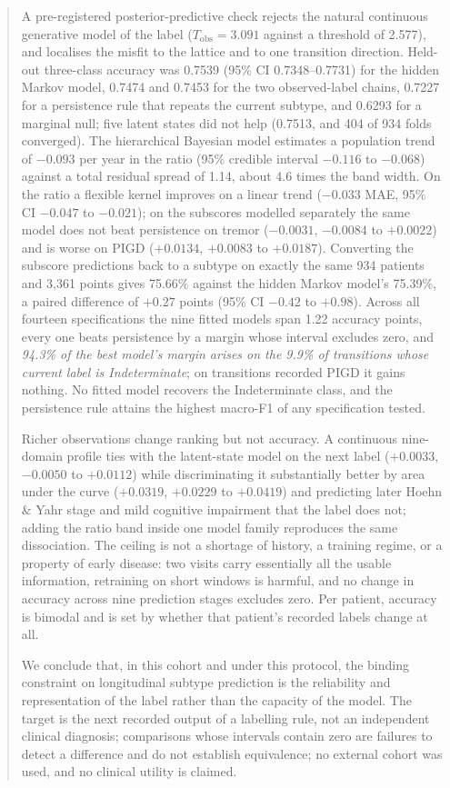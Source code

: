 \documentclass[11pt]{article}
\begin{document}
\begin{abstract}
A pre-registered posterior-predictive check rejects the natural continuous
generative model of the label ($T_{\mathrm{obs}} = 3.091$ against a threshold of
2.577), and localises the misfit to the lattice and to one transition
direction. Held-out three-class accuracy was 0.7539 (95\% CI 0.7348--0.7731) for
the hidden Markov model, 0.7474 and 0.7453 for the two observed-label chains,
0.7227 for a persistence rule that repeats the current subtype, and 0.6293 for
a marginal null; five latent states did not help (0.7513, and 404 of 934 folds
converged). The hierarchical Bayesian model estimates a population trend of
$-0.093$ per year in the ratio (95\% credible interval $-0.116$ to $-0.068$)
against a total residual spread of 1.14, about 4.6 times the band width. On the
ratio a flexible kernel improves on a linear trend ($-0.033$ MAE, 95\% CI
$-0.047$ to $-0.021$); on the subscores modelled separately the same model does
not beat persistence on tremor ($-0.0031$, $-0.0084$ to $+0.0022$) and is worse
on PIGD ($+0.0134$, $+0.0083$ to $+0.0187$). Converting the subscore
predictions back to a subtype on exactly the same 934 patients and 3,361 points
gives 75.66\% against the hidden Markov model's 75.39\%, a paired difference of
$+0.27$ points (95\% CI $-0.42$ to $+0.98$). Across all fourteen specifications
the nine fitted models span 1.22 accuracy points, every one beats persistence by
a margin whose interval excludes zero, and \emph{94.3\% of the best model's
margin arises on the 9.9\% of transitions whose current label is Indeterminate};
on transitions recorded PIGD it gains nothing. No fitted model recovers the
Indeterminate class, and the persistence rule attains the highest macro-F1 of
any specification tested.

Richer observations change ranking but not accuracy. A continuous nine-domain
profile ties with the latent-state model on the next label ($+0.0033$, $-0.0050$
to $+0.0112$) while discriminating it substantially better by area under the
curve ($+0.0319$, $+0.0229$ to $+0.0419$) and predicting later Hoehn \& Yahr
stage and mild cognitive impairment that the label does not; adding the ratio
band inside one model family reproduces the same dissociation. The ceiling is
not a shortage of history, a training regime, or a property of early disease: two
visits carry essentially all the usable information, retraining on short windows
is harmful, and no change in accuracy across nine prediction stages excludes
zero. Per patient, accuracy is bimodal and is set by whether that patient's
recorded labels change at all.

We conclude that, in this cohort and under this protocol, the binding constraint
on longitudinal subtype prediction is the reliability and representation of the
label rather than the capacity of the model. The target is the next recorded
output of a labelling rule, not an independent clinical diagnosis; comparisons
whose intervals contain zero are failures to detect a difference and do not
establish equivalence; no external cohort was used, and no clinical utility is
claimed.
\end{abstract}
\end{document}
